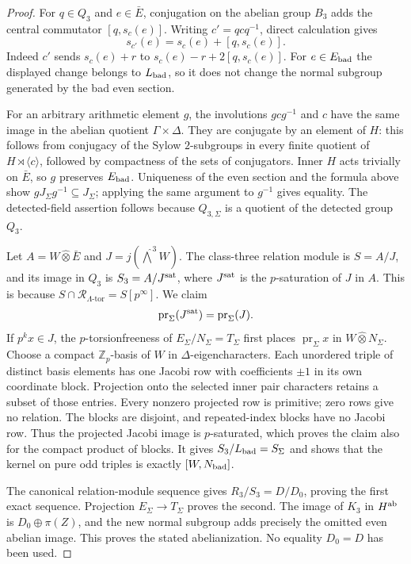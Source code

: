 \begin{proof}
For $q\in Q_3$ and $e\in\bar E$, conjugation on the abelian
group $B_3$ adds the central commutator $[q,s_c(e)]$.
Writing $c'=qcq^{-1}$, direct calculation gives
\[
 s_{c'}(e)=s_c(e)+[q,s_c(e)].
\]
Indeed $c'$ sends $s_c(e)+r$ to
$s_c(e)-r+2[q,s_c(e)]$.  For $e\in E_{\rm bad}$ the displayed
change belongs to $L_{\rm bad}$, so it does not change the normal
subgroup generated by the bad even section.

For an arbitrary arithmetic element $g$, the involutions
$gcg^{-1}$ and $c$ have the same image in the abelian quotient
$\Gamma\times\Delta$.  They are conjugate by an element of $H$:
this follows from conjugacy of the Sylow $2$-subgroups in every
finite quotient of $H\rtimes\langle c\rangle$, followed by
compactness of the sets of conjugators.  Inner $H$ acts trivially
on $\bar E$, so $g$ preserves $E_{\rm bad}$.  Uniqueness of the
even section and the formula above show $gJ_\Sigma g^{-1}
\subseteq J_\Sigma$; applying the same argument to $g^{-1}$
gives equality.  The detected-field assertion follows because
$Q_{3,\Sigma}$ is a quotient of the detected group $Q_3$.

Let $A=W\widehat\otimes\bar E$ and
$J=j(\widehat\bigwedge^3W)$.  The class-three relation module
is $S=A/J$, and its image in $Q_3$ is
$S_3=A/J^{\rm sat}$, where $J^{\rm sat}$ is the $p$-saturation
of $J$ in $A$.  This is because
$S\cap\mathcal R_{\Lambda\text{-tor}}=S[p^\infty]$.
We claim
\[
 \operatorname{pr}_\Sigma(J^{\rm sat})
                 =\operatorname{pr}_\Sigma(J).
\]
If $p^kx\in J$, the $p$-torsionfreeness of
$E_\Sigma/N_\Sigma=T_\Sigma$ first places
$\operatorname{pr}_\Sigma x$ in $W\widehat\otimes N_\Sigma$.
Choose a compact $\mathbb Z_p$-basis of $W$ in
$\Delta$-eigencharacters.  Each unordered triple of distinct
basis elements has one Jacobi row with coefficients $\pm1$ in
its own coordinate block.  Projection onto the selected inner
pair characters retains a subset of those entries.  Every
nonzero projected row is primitive; zero rows give no relation.
The blocks are disjoint, and repeated-index blocks have no
Jacobi row.  Thus the projected Jacobi image is $p$-saturated,
which proves the claim also for the compact product of blocks.
It gives $S_3/L_{\rm bad}=S_\Sigma$ and shows that the kernel
on pure odd triples is exactly $[W,N_{\rm bad}]$.

The canonical relation-module sequence gives
$R_3/S_3=D/D_0$, proving the first exact sequence.  Projection
$E_\Sigma\to T_\Sigma$ proves the second.  The image of
$K_3$ in $H^{\rm ab}$ is $D_0\oplus\pi(Z)$, and the new
normal subgroup adds precisely the omitted even abelian image.
This proves the stated abelianization.  No equality $D_0=D$
has been used.


\end{proof}
